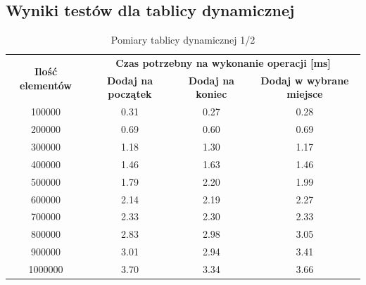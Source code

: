 \documentclass{article}
\begin{document}
    \subsection{Wyniki testów dla tablicy dynamicznej}
    \begin{table}[H]
        \centering
        \begin{tabular}{|c|ccc|}
            \hline
            \multirow{2}{*}{\textbf{Ilość   elementów}} & \multicolumn{3}{c|}{\textbf{Czas   potrzebny na wykonanie operacji {[}ms{]}}} \\ \cline{2-4} 
             & \multicolumn{1}{c|}{\textbf{Dodaj na początek}} & \multicolumn{1}{c|}{\textbf{Dodaj na koniec}} & \textbf{Dodaj w wybrane   miejsce} \\ \hline
            100000 & \multicolumn{1}{c|}{0.31} & \multicolumn{1}{c|}{0.27} & 0.28 \\ \hline
            200000 & \multicolumn{1}{c|}{0.69} & \multicolumn{1}{c|}{0.60} & 0.69 \\ \hline
            300000 & \multicolumn{1}{c|}{1.18} & \multicolumn{1}{c|}{1.30} & 1.17 \\ \hline
            400000 & \multicolumn{1}{c|}{1.46} & \multicolumn{1}{c|}{1.63} & 1.46 \\ \hline
            500000 & \multicolumn{1}{c|}{1.79} & \multicolumn{1}{c|}{2.20} & 1.99 \\ \hline
            600000 & \multicolumn{1}{c|}{2.14} & \multicolumn{1}{c|}{2.19} & 2.27 \\ \hline
            700000 & \multicolumn{1}{c|}{2.33} & \multicolumn{1}{c|}{2.30} & 2.33 \\ \hline
            800000 & \multicolumn{1}{c|}{2.83} & \multicolumn{1}{c|}{2.98} & 3.05 \\ \hline
            900000 & \multicolumn{1}{c|}{3.01} & \multicolumn{1}{c|}{2.94} & 3.41 \\ \hline
            1000000 & \multicolumn{1}{c|}{3.70} & \multicolumn{1}{c|}{3.34} & 3.66 \\ \hline
        \end{tabular}
        \caption{Pomiary tablicy dynamicznej 1/2}
    \end{table}
\end{document}

